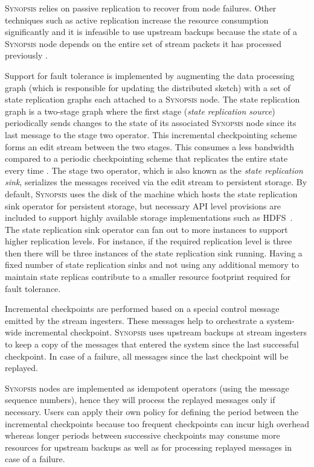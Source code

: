 \textsc{Synopsis} relies on passive replication to recover from node failures.
Other techniques such as active replication increase the resource consumption significantly and it is infeasible to use upstream backups because the state of a \textsc{Synopsis} node depends on the entire set of stream packets it has processed previously \cite{castro2013integrating}.

Support for fault tolerance is implemented by augmenting the data processing graph (which is responsible for updating the distributed sketch) 	with a set of state replication graphs each attached to a \textsc{Synopsis} node.
The state replication graph is a two-stage graph where the first stage (\textit{state replication source}) periodically sends changes to the state of its associated \textsc{Synopsis} node since its last message to the stage two operator.
This incremental checkpointing scheme forms an edit stream between the two stages.
This consumes a less bandwidth compared to a periodic checkpointing scheme that replicates the entire state every time \cite{castro2013integrating}.
The stage two operator, which is also known as the \textit{state replication sink}, serializes the messages received via the edit stream to persistent storage.
By default, \textsc{Synopsis} uses the disk of the machine which hosts the state replication sink operator for persistent storage, but necessary API level provisions are included to support highly available storage implementations such as HDFS~\cite{borthakur2008hdfs}.
The state replication sink operator can fan out to more instances to support higher replication levels.
For instance, if the required replication level is three then there will be three instances of the state replication sink running.
Having a fixed number of state replication sinks and not using any additional memory to maintain state replicas contribute to a smaller resource footprint required for fault tolerance.

Incremental checkpoints are performed based on a special control message emitted by the stream ingesters.
These messages help to orchestrate a system-wide incremental checkpoint.
\textsc{Synopsis} uses upstream backups at stream ingesters to keep a copy of the messages that entered the system since the last successful checkpoint.
In case of a failure, all messages since the last checkpoint will be replayed.

\textsc{Synopsis} nodes are implemented as idempotent operators (using the message sequence numbers), hence they will process the replayed messages only if necessary.
Users can apply their own policy for defining the period between the incremental checkpoints because too frequent checkpoints can incur high overhead whereas longer periods between successive checkpoints may consume more resources for upstream backups as well as for processing replayed messages in case of a failure.

